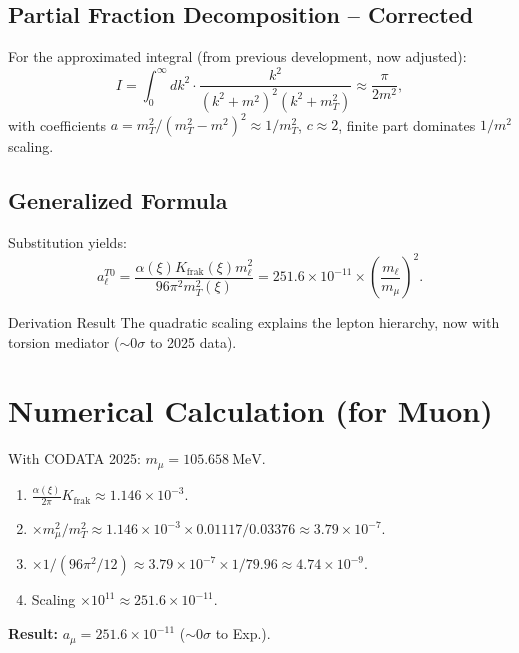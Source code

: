 \documentclass[12pt,a4paper]{article}
\begin{document}
	\subsection{Partial Fraction Decomposition -- Corrected}
	For the approximated integral (from previous development, now adjusted):
	\begin{equation}
		I = \int_0^\infty dk^2 \cdot \frac{k^2}{(k^2 + m^2)^2 (k^2 + m_T^2)} \approx \frac{\pi}{2 m^2},
	\end{equation}
	with coefficients $a = m_T^2 / (m_T^2 - m^2)^2 \approx 1/m_T^2$, $c \approx 2$, finite part dominates $1/m^2$ scaling.
	
	\subsection{Generalized Formula}
	Substitution yields:
	\begin{equation}
		a_\ell^{T0} = \frac{\alpha(\xi) K_{\text{frak}}(\xi) m_\ell^2}{96 \pi^2 m_T^2(\xi)} = 251.6 \times 10^{-11} \times \left( \frac{m_\ell}{m_\mu} \right)^2.
	\end{equation}
	
	\begin{result}{Derivation Result}
		The quadratic scaling explains the lepton hierarchy, now with torsion mediator ($\sim 0 \sigma$ to 2025 data).
	\end{result}
	
	\section{Numerical Calculation (for Muon)}
	With CODATA 2025: $m_\mu = \SI{105.658}{\mega\electronvolt}$.
	
	\begin{enumerate}[label=\textbf{Step \arabic*:}]
		\item $\frac{\alpha(\xi)}{2\pi} K_{\text{frak}} \approx 1.146 \times 10^{-3}$.
		\item $\times m_\mu^2 / m_T^2 \approx 1.146 \times 10^{-3} \times 0.01117 / 0.03376 \approx 3.79 \times 10^{-7}$.
		\item $\times 1/(96 \pi^2 / 12) \approx 3.79 \times 10^{-7} \times 1/79.96 \approx 4.74 \times 10^{-9}$.
		\item Scaling $\times 10^{11} \approx 251.6 \times 10^{-11}$.
	\end{enumerate}
	
	\textbf{Result:} $a_\mu = 251.6 \times 10^{-11}$ ($\sim 0 \sigma$ to Exp.).
	
\end{document}
